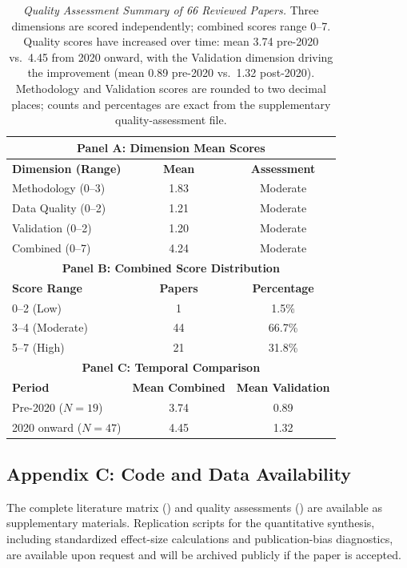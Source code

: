 \documentclass[11pt,twocolumn]{article}
\begin{document}
\begin{table}[htbp]
\centering
\small
\caption{\textit{Quality Assessment Summary of 66 Reviewed Papers.} Three dimensions are scored independently; combined scores range 0--7. Quality scores have increased over time: mean 3.74 pre-2020 vs.~4.45 from 2020 onward, with the Validation dimension driving the improvement (mean 0.89 pre-2020 vs.~1.32 post-2020). Methodology and Validation scores are rounded to two decimal places; counts and percentages are exact from the supplementary quality-assessment file.}
\label{tab:quality}
\begin{tabular}{|l|c|c|}
\hline
\multicolumn{3}{|c|}{\textbf{Panel A: Dimension Mean Scores}} \\
\hline
\textbf{Dimension (Range)} & \textbf{Mean} & \textbf{Assessment} \\
\hline
Methodology (0--3) & 1.83 & Moderate \\
Data Quality (0--2) & 1.21 & Moderate \\
Validation (0--2) & 1.20 & Moderate \\
Combined (0--7) & 4.24 & Moderate \\
\hline
\multicolumn{3}{|c|}{\textbf{Panel B: Combined Score Distribution}} \\
\hline
\textbf{Score Range} & \textbf{Papers} & \textbf{Percentage} \\
\hline
0--2 (Low) & 1 & 1.5\% \\
3--4 (Moderate) & 44 & 66.7\% \\
5--7 (High) & 21 & 31.8\% \\
\hline
\multicolumn{3}{|c|}{\textbf{Panel C: Temporal Comparison}} \\
\hline
\textbf{Period} & \textbf{Mean Combined} & \textbf{Mean Validation} \\
\hline
Pre-2020 ($N=19$) & 3.74 & 0.89 \\
2020 onward ($N=47$) & 4.45 & 1.32 \\
\hline
\end{tabular}
\end{table}

\subsection*{Appendix C: Code and Data Availability}

The complete literature matrix () and quality assessments () are available as supplementary materials. Replication scripts for the quantitative synthesis, including standardized effect-size calculations and publication-bias diagnostics, are available upon request and will be archived publicly if the paper is accepted.
\end{document}
